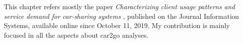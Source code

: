 
%

This chapter refers mostly the paper \textit{Characterizing client usage patterns and service demand for car-sharing systems} \cite{VancouverCS}, published on the Journal Information Systems, available online since October 11, 2019. My contribution is mainly focused in all the aspects about car2go analyses. 

